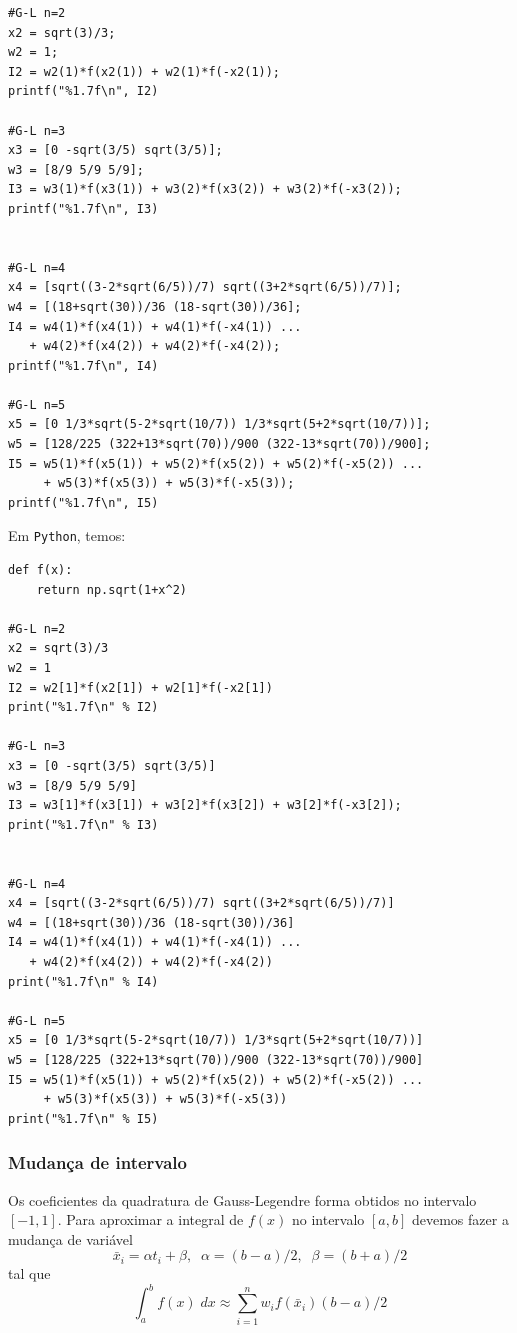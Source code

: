 \begin{sol}
\begin{verbatim}
#G-L n=2
x2 = sqrt(3)/3;
w2 = 1;
I2 = w2(1)*f(x2(1)) + w2(1)*f(-x2(1));
printf("%1.7f\n", I2)

#G-L n=3
x3 = [0 -sqrt(3/5) sqrt(3/5)];
w3 = [8/9 5/9 5/9];
I3 = w3(1)*f(x3(1)) + w3(2)*f(x3(2)) + w3(2)*f(-x3(2));
printf("%1.7f\n", I3)


#G-L n=4
x4 = [sqrt((3-2*sqrt(6/5))/7) sqrt((3+2*sqrt(6/5))/7)];
w4 = [(18+sqrt(30))/36 (18-sqrt(30))/36];
I4 = w4(1)*f(x4(1)) + w4(1)*f(-x4(1)) ...
   + w4(2)*f(x4(2)) + w4(2)*f(-x4(2));
printf("%1.7f\n", I4)

#G-L n=5
x5 = [0 1/3*sqrt(5-2*sqrt(10/7)) 1/3*sqrt(5+2*sqrt(10/7))];
w5 = [128/225 (322+13*sqrt(70))/900 (322-13*sqrt(70))/900];
I5 = w5(1)*f(x5(1)) + w5(2)*f(x5(2)) + w5(2)*f(-x5(2)) ...
     + w5(3)*f(x5(3)) + w5(3)*f(-x5(3));
printf("%1.7f\n", I5)
\end{verbatim}
\fi 
\ifispython
Em \verb+Python+, temos:
\begin{verbatim}
def f(x):
    return np.sqrt(1+x^2)

#G-L n=2
x2 = sqrt(3)/3
w2 = 1
I2 = w2[1]*f(x2[1]) + w2[1]*f(-x2[1])
print("%1.7f\n" % I2)

#G-L n=3
x3 = [0 -sqrt(3/5) sqrt(3/5)]
w3 = [8/9 5/9 5/9]
I3 = w3[1]*f(x3[1]) + w3[2]*f(x3[2]) + w3[2]*f(-x3[2]);
print("%1.7f\n" % I3)


#G-L n=4
x4 = [sqrt((3-2*sqrt(6/5))/7) sqrt((3+2*sqrt(6/5))/7)]
w4 = [(18+sqrt(30))/36 (18-sqrt(30))/36]
I4 = w4(1)*f(x4(1)) + w4(1)*f(-x4(1)) ...
   + w4(2)*f(x4(2)) + w4(2)*f(-x4(2))
print("%1.7f\n" % I4)

#G-L n=5
x5 = [0 1/3*sqrt(5-2*sqrt(10/7)) 1/3*sqrt(5+2*sqrt(10/7))]
w5 = [128/225 (322+13*sqrt(70))/900 (322-13*sqrt(70))/900]
I5 = w5(1)*f(x5(1)) + w5(2)*f(x5(2)) + w5(2)*f(-x5(2)) ...
     + w5(3)*f(x5(3)) + w5(3)*f(-x5(3))
print("%1.7f\n" % I5)
\end{verbatim}
\fi 
\end{sol}

\subsubsection{Mudança de intervalo}
Os coeficientes da quadratura de Gauss-Legendre forma obtidos no intervalo $[-1,1]$. Para aproximar a integral de $f(x)$ no intervalo $[a,b]$ devemos fazer a mudança de variável
$$ \bar{x}_i=\alpha t_i+ \beta , \;\; \alpha =(b-a)/2, \;\; \beta = (b+a)/2 $$
tal que 
$$
 \int_{a}^{b} f(x) \; dx \approx \sum_{i=1}^n w_i f( \bar{x}_i ) (b-a)/2
$$

